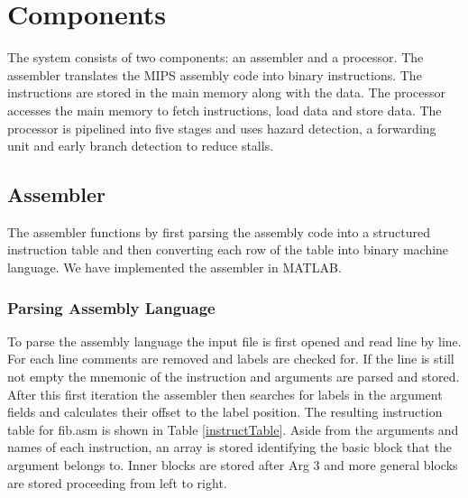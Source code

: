 \documentclass[conference]{IEEEtran}
\begin{document}
\section{Components}

The system consists of two components: an assembler and a processor. The assembler translates the MIPS assembly code into binary instructions. The instructions are stored in the main memory along with the data. The processor accesses the main memory to fetch instructions, load data and store data. The processor is pipelined into five stages and uses hazard detection, a forwarding unit and early branch detection to reduce stalls.

\subsection{Assembler}

The assembler functions by first parsing the assembly code into a structured instruction table and then converting each row of the table into binary machine language. We have implemented the assembler in MATLAB.

\subsubsection{Parsing Assembly Language}
To parse the assembly language the input file is first opened and read line by line. For each line comments are removed and labels are checked for. If the line is still not empty the mnemonic of the instruction and arguments are parsed and stored. After this first iteration the assembler then searches for labels in the argument fields and calculates their offset to the label position. The resulting instruction table for fib.asm is shown in Table \ref{instructTable}. Aside from the arguments and names of each instruction, an array is stored identifying the basic block that the argument belongs to. Inner blocks are stored after Arg 3 and more general blocks are stored proceeding from left to right. 
\end{document}
